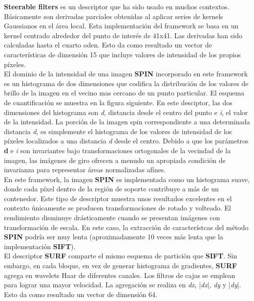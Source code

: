 \textbf{Steerable filters} es un descriptor que ha sido usado en muchos contextos. Básicamente son derivadas parciales obtenidas al aplicar series de kernels Gaussianos en el área local. Esta implementación del framework se basa en un kernel centrado alrededor del punto de interés de 41x41. Las derivadas han sido calculadas hasta el cuarto oden. Esto da como resultado un vector de características de dimensión 15 que incluye valores de intensidad de los propios píxeles. \\

El dominio de la intensidad de una imagen \textbf{SPIN} incorporado en este framework es un histograma de dos dimensiones que codifica la distribución de los valores de brillo de la imagen en el vecino mas cercano de un punto particular. El esquema de cuantificación se muestra en la figura siguiente. En este desciptor, las dos dimensiones del histograma son \textit{d}, distancia desde el centro del punto e \textit{i}, el valor de la intensidad. La porción de la imagen spin correspondiente a una determinada distancia \textit{d}, es simplemente el histograma de los valores de intensidad de los píxeles localizados a una distancia \textit{d} desde el centro. Debido a que los parámetros \textbf{d} e \textit{i} son invariantes bajo transformaciones ortogonales de la vecindad de la imagen, las imágenes de giro ofrecen a menudo un apropiada condición de invarianza para representar  áreas normalizadas afínes.\\

En este framework, la imagen \textbf{SPIN} es implementada como un histograma suave, donde cada píxel dentro de la región de soporte contribuye a más de un contenedor. Este tipo de descriptor muestra unos resultados excelentes en el contexto únicamente se producen transformaciones de rotado y volteado. El rendimiento disminuye drásticamente cuando se presentan imágenes con transformación de escala. En este caso, la extracción de característcas del método \textbf{SPIN} podría ser muy lenta (aproximadamente 10 veces más lenta que la implementación \textbf{SIFT}). \\

El descriptor \textbf{SURF} comparte el mismo esquema de partición que \textbf{SIFT}. Sin embargo, en cada bloque, en vez de generar histograma de gradientes, \textbf{SURF} agrega en wavelets Haar de diferentes canales. Los filtros de cajas se emplean para lograr una mayor velocidad. La agregación se realiza en \textit{dx}, |\textit{dx}|, \textit{dy} y |\textit{dy}|. Esto da como resultado un vector de dimensión 64. \\

